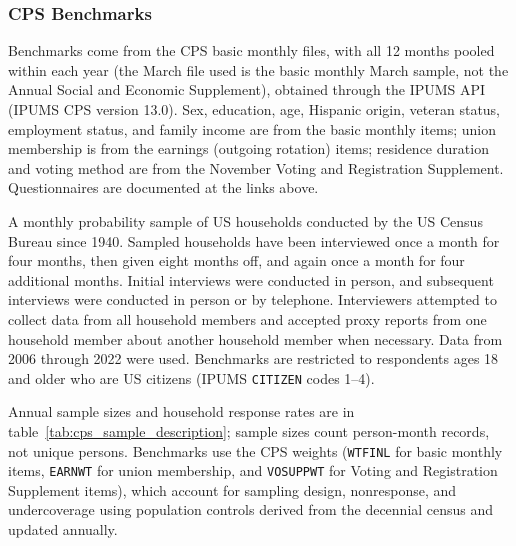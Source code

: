 \documentclass[12pt]{article}
\begin{document}
\subsubsection*{CPS Benchmarks}
Benchmarks come from the CPS basic monthly files, with all 12 months pooled within each year (the March file used is the basic monthly March sample, not the Annual Social and Economic Supplement), obtained through the IPUMS API (IPUMS CPS version 13.0). Sex, education, age, Hispanic origin, veteran status, employment status, and family income are from the basic monthly items; union membership is from the earnings (outgoing rotation) items; residence duration and voting method are from the November Voting and Registration Supplement. Questionnaires are documented at the links above.

A monthly probability sample of US households conducted by the US Census Bureau since 1940. Sampled households have been interviewed once a month for four months, then given eight months off, and again once a month for four additional months. Initial interviews were conducted in person, and subsequent interviews were conducted in person or by telephone. Interviewers attempted to collect data from all household members and accepted proxy reports from one household member about another household member when necessary. Data from 2006 through 2022 were used. Benchmarks are restricted to respondents ages 18 and older who are US citizens (IPUMS \texttt{CITIZEN} codes 1--4).

Annual sample sizes and household response rates are in table~\ref{tab:cps_sample_description}; sample sizes count person-month records, not unique persons. Benchmarks use the CPS weights (\texttt{WTFINL} for basic monthly items, \texttt{EARNWT} for union membership, and \texttt{VOSUPPWT} for Voting and Registration Supplement items), which account for sampling design, nonresponse, and undercoverage using population controls derived from the decennial census and updated annually.
\end{document}
